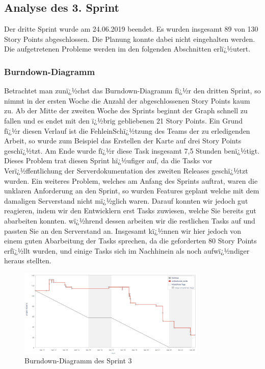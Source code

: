 \documentclass[12pt, titlepage]{scrartcl}
\begin{document}
		\subsection{Analyse des 3. Sprint}
		Der dritte Sprint wurde am 24.06.2019 beendet. Es wurden insgesamt 89 von 130 Story Points abgeschlossen. Die Planung konnte dabei nicht eingehalten werden. Die aufgetretenen Probleme werden im den folgenden Abschnitten erlï¿½utert.
		
		\subsubsection{Burndown-Diagramm}
		Betrachtet man zunï¿½chst das Burndown-Diagramm fï¿½r den dritten Sprint, so nimmt in der ersten Woche die Anzahl der abgeschlossenen Story Points kaum zu. Ab der Mitte der zweiten Woche des Sprints beginnt der Graph schnell zu fallen und es endet mit den ï¿½brig gebliebenen 21 Story Points. Ein Grund fï¿½r diesen Verlauf ist die FehleinSchï¿½tzung des Teams der zu erledigenden Arbeit, so wurde zum Beispiel das Erstellen der Karte auf drei Story Points geschï¿½tzt. Am Ende wurde fï¿½r diese Task insgesamt 7,5 Stunden benï¿½tigt. Dieses Problem trat diesen Sprint hï¿½ufiger auf, da die Tasks vor Verï¿½ffentlichung der Serverdokumentation des zweiten Releases geschï¿½tzt wurden. Ein weiteres Problem, welches am Anfang des Sprints auftrat, waren die unklaren Anforderung an den Sprint, so wurden Features geplant welche mit dem damaligen Serverstand nicht mï¿½glich waren. Darauf konnten wir jedoch gut reagieren, indem wir den Entwicklern erst Tasks zuwiesen, welche Sie bereits gut abarbeiten konnten. wï¿½hrend dessen arbeiten wir die restlichen Tasks auf und passten Sie an den Serverstand an. Insgesamt kï¿½nnen wir hier jedoch von einem guten Abarbeitung der Tasks sprechen, da die geforderten 80 Story Points erfï¿½llt wurden, und einige Tasks sich im Nachhinein als noch aufwï¿½ndiger heraus stellten. 
		
		\begin{figure}[H] 
			\centering
			\includegraphics[width=0.8\textwidth]{BurndownChart_Sprint3.PNG}
			\caption{Burndown-Diagramm des Sprint 3}
			\label{BurndownSprint3}
		\end{figure}
		
\end{document}
